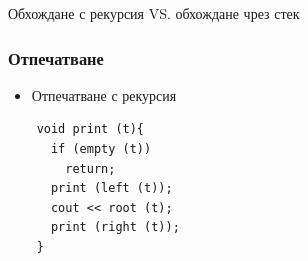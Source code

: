 \documentclass{beamer}
\begin{document}
\begin{frame}
\centerline{Обхождане с рекурсия VS. обхождане чрез стек}
\end{frame}


\begin{frame}[fragile]
\frametitle{Отпечатване}

\begin{itemize}
  \item Отпечатване с рекурсия
\end{itemize}

\begin{flushleft}
  \begin{lstlisting}
    void print (t){
      if (empty (t))
        return;
      print (left (t));
      cout << root (t);
      print (right (t));
    }
  \end{lstlisting}
\end{flushleft}

\end{frame}
\end{document}
